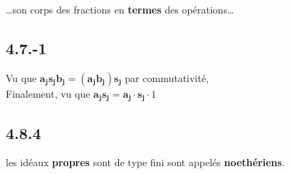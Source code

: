 \documentclass[11pt]{article}
\begin{document}
\dots son corps des fractions en \textbf{termes} des opérations\dots

\subsection*{4.7.-1}
Vu que $\pmb{a_js_jb_j = (a_jb_j)s_j}$ par commutativité, 
\\
 Finalement, vu que $\pmb{a_js_j = a_j \cdot s_j} \cdot 1$

\subsection*{4.8.4}

 les idéaux \textbf{propres} sont de type fini sont appelés \textbf{noethériens}.


 	
\end{document}
